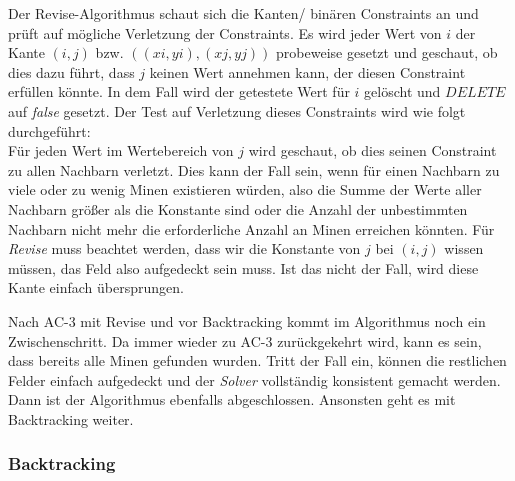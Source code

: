 Der Revise-Algorithmus schaut sich die Kanten/ binären Constraints an und prüft auf mögliche Verletzung der Constraints. Es wird jeder Wert
von $i$ der Kante $(i,j)$ bzw. $((xi, yi), (xj, yj))$ probeweise gesetzt und geschaut, ob dies dazu führt, dass $j$ keinen Wert annehmen kann,
der diesen Constraint erfüllen könnte. In dem Fall wird der getestete Wert für $i$ gelöscht und $DELETE$ auf \textit{false} gesetzt. Der Test
auf Verletzung dieses Constraints wird wie folgt durchgeführt:\\ Für jeden Wert im Wertebereich von $j$ wird geschaut, ob dies seinen Constraint
zu allen Nachbarn verletzt. Dies kann der Fall sein, wenn für einen Nachbarn zu viele oder zu wenig Minen existieren würden, also die Summe
der Werte aller Nachbarn größer als die Konstante sind oder die Anzahl der unbestimmten Nachbarn nicht mehr die erforderliche Anzahl an Minen 
erreichen könnten. 
Für \textit{Revise} muss beachtet werden, dass wir die Konstante von $j$ bei $(i,j)$ wissen müssen, das Feld also aufgedeckt sein muss. Ist
das nicht der Fall, wird diese Kante einfach übersprungen.

Nach AC-3 mit Revise und vor Backtracking kommt im Algorithmus noch ein Zwischenschritt. Da immer wieder zu AC-3 zurückgekehrt wird, kann es 
sein, dass bereits alle Minen gefunden wurden. Tritt der Fall ein, können die restlichen Felder einfach aufgedeckt und der \textit{Solver}
vollständig konsistent gemacht werden. Dann ist der Algorithmus ebenfalls abgeschlossen. Ansonsten geht es mit Backtracking weiter.

\subsubsection{Backtracking}

